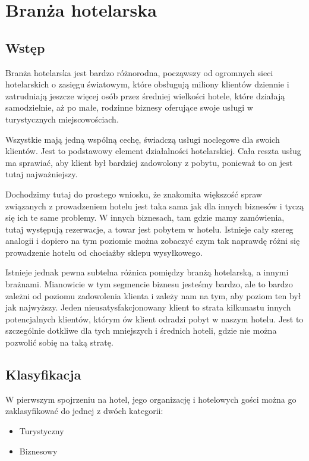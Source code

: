 \documentclass[12pt, a4paper]{article}
\begin{document}
\section{Branża hotelarska}

\subsection{Wstęp}

Branża hotelarska jest bardzo różnorodna, począwszy od ogromnych sieci
hotelarskich o zasięgu światowym, które obsługują miliony klientów dziennie i zatrudniają
 jeszcze więcej osób przez średniej wielkości hotele, które działają
 samodzielnie, aż po małe, rodzinne biznesy oferujące swoje usługi
 w turystycznych miejscowościach.
 
  Wszystkie mają jedną wspólną cechę,
 świadczą usługi noclegowe dla swoich klientów. Jest to podstawowy element
 działalności hotelarskiej. Cała reszta usług ma sprawiać, aby klient był
 bardziej zadowolony z pobytu, ponieważ to on jest tutaj najważniejszy.
 
  Dochodzimy tutaj do prostego wniosku, że znakomita
 większość spraw związanych z prowadzeniem hotelu jest taka sama jak dla innych
 biznesów i tyczą się ich te same problemy. W innych biznesach, tam gdzie mamy
 zamówienia, tutaj występują rezerwacje, a towar jest pobytem w hotelu. Istnieje
 cały szereg analogii i dopiero na tym poziomie można zobaczyć czym tak naprawdę
 różni się prowadzenie hotelu od chociażby sklepu wysyłkowego.
 
 Istnieje jednak pewna subtelna różnica pomiędzy branżą hotelarską, a innymi
 brażnami. Mianowicie w tym segmencie biznesu jesteśmy bardzo, ale to bardzo
 zależni od poziomu zadowolenia klienta i zależy nam na tym, aby poziom ten był
 jak najwyższy. Jeden nieusatysfakcjonowany klient to strata kilkunastu
 innych potencjalnych klientów, którym ów klient odradzi pobyt w naszym hotelu.
 Jest to szczególnie dotkliwe dla tych mniejszych i średnich hoteli, gdzie nie
 można pozwolić sobię na taką stratę.

\subsection{Klasyfikacja}
W pierwszym spojrzeniu na hotel, jego organizację i hotelowych gości można go
zaklasyfikować do jednej z dwóch kategorii:
\begin{itemize}
  \item Turystyczny
  \item Biznesowy 
\end{itemize}
\end{document}
